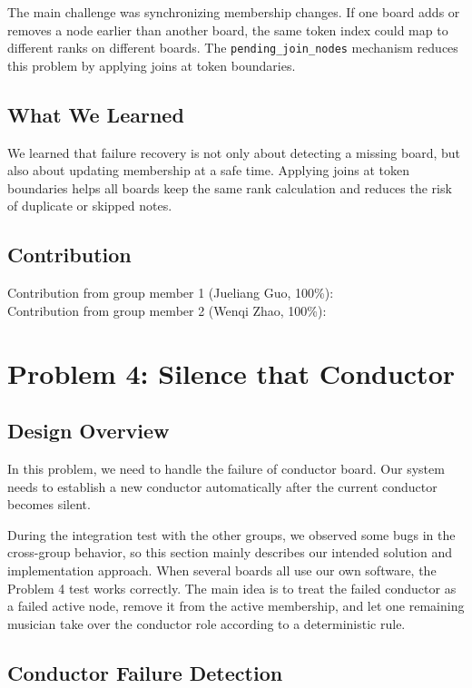 \documentclass[11pt,a4paper]{article}
\begin{document}
The main challenge was synchronizing membership changes. If one board adds or removes a node earlier than another board, the same token index could map to different ranks on different boards. The \texttt{pending\_\allowbreak{}join\_\allowbreak{}nodes} mechanism reduces this problem by applying joins at token boundaries.

\subsection*{What We Learned}

We learned that failure recovery is not only about detecting a missing board, but also about updating membership at a safe time. Applying joins at token boundaries helps all boards keep the same rank calculation and reduces the risk of duplicate or skipped notes.

\subsection*{Contribution}

Contribution from group member 1 (Jueliang Guo, 100\%):\\
Contribution from group member 2 (Wenqi Zhao, 100\%):

\section*{Problem 4: Silence that Conductor}

\subsection*{Design Overview}

In this problem, we need to handle the failure of conductor board. Our system needs to establish a new conductor automatically after the current conductor becomes silent.

During the integration test with the other groups, we observed some bugs in the cross-group behavior, so this section mainly describes our intended solution and implementation approach. When several boards all use our own software, the Problem 4 test works correctly. The main idea is to treat the failed conductor as a failed active node, remove it from the active membership, and let one remaining musician take over the conductor role according to a deterministic rule.

\subsection*{Conductor Failure Detection}
\end{document}
